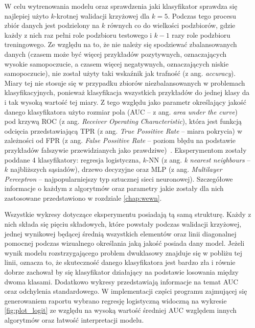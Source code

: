 \documentclass[a4paper,twoside,12pt]{book}
\newcommand{\obcy}[1]{\emph{#1}}
\newcommand{\ang}[1]{{\selectlanguage{british}\obcy{#1}}}
\begin{document}
W celu wytrenowania modelu oraz sprawdzenia jaki klasyfikator sprawdza się najlepiej użyto $k$-krotnej walidacji krzyżowej dla $k=5$. Podczas tego procesu zbiór danych jest podzielony na $k$ równych co do wielkości podzbiorów, gdzie każdy z nich raz pełni role podzbioru testowego i $k-1$ razy role podzbioru treningowego. Ze względu na to, że nie należy się spodziewać zbalansowanych danych (czasem może być więcej przykładów pozytywnych, oznaczających wysokie samopoczucie, a czasem więcej negatywnych, oznaczających niskie samopoczucie), nie został użyty taki wskaźnik jak trafność (z ang. \ang{accuracy}). Miary tej nie stosuje się w przypadku zbiorów niezbalansowanych w problemach klasyfikacyjnych, ponieważ klasyfikacja wszystkich przykładów do jednej klasy da i tak wysoką wartość tej miary. Z tego względu jako parametr określający jakość danego klasyfikatora użyto rozmiar pola (AUC -- z ang. \ang{area under the curve}) pod krzywą ROC (z ang. \ang{Receiver Operating Characteristic}), która jest funkcją odcięcia przedstawiającą TPR (z ang. \ang{True Possitive Rate} -- miara pokrycia) w zależności od FPR (z ang. \ang{False Possitive Rate} -- poziom błędu na podstawie przykładów fałszywie przewidzianych jako prawdziwe)~\cite{auc_roc}. Eksperymentom zostały poddane 4 klasyfikatory: regresja logistyczna, $k$-NN (z ang. \ang{k nearest neighbours} -- $k$ najbliższych sąsiadów), drzewo decyzyjne oraz MLP (z ang. \ang{Multilayer Perceptron} -- najpopularniejszy typ sztucznej sieci neuronowej). Szczegółowe informacje o każdym z algorytmów oraz parametry jakie zostały dla nich zastosowane przedstawiono w rozdziale \ref{chap:wewn}.

Wszystkie wykresy dotyczące eksperymentu posiadają tą samą strukturę. Każdy z nich składa się pięciu składowych, które powstały podczas walidacji krzyżowej, jednej wynikowej będącej średnią wszystkich elementów oraz linii diagonalnej pomocnej podczas wizualnego określania jaką jakość posiada dany model. Jeżeli wynik modelu rozstrzygającego problem dwuklasowy znajduje się w pobliżu tej linii, oznacza to, że skuteczność danego klasyfikatora jest bardzo zła i równie dobrze zachował by się klasyfikator działający na podstawie losowania między dwoma klasami. Dodatkowo wykresy przedstawiają informacje na temat AUC oraz odchylenia standardowego. W implementacji części programu zajmującej się generowaniem raportu wybrano regresję logistyczną widoczną na wykresie \ref{fig:plot_logit} ze względu na wysoką wartość średniej AUC względem innych algorytmów oraz łatwość interpretacji modelu.
\end{document}
